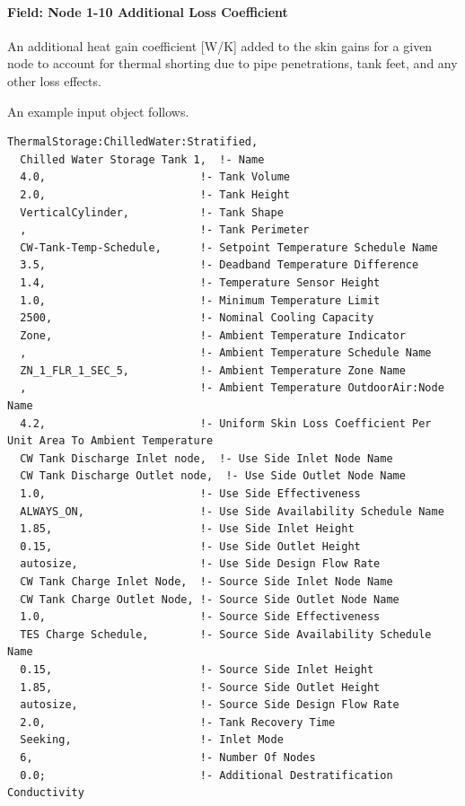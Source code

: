 \paragraph{Field: Node 1-10 Additional Loss Coefficient}\label{field-node-1-10-additional-loss-coefficient}

An additional heat gain coefficient {[}W/K{]} added to the skin gains for a given node to account for thermal shorting due to pipe penetrations, tank feet, and any other loss effects.

An example input object follows.

\begin{lstlisting}
ThermalStorage:ChilledWater:Stratified,
  Chilled Water Storage Tank 1,  !- Name
  4.0,                        !- Tank Volume
  2.0,                        !- Tank Height
  VerticalCylinder,           !- Tank Shape
  ,                           !- Tank Perimeter
  CW-Tank-Temp-Schedule,      !- Setpoint Temperature Schedule Name
  3.5,                        !- Deadband Temperature Difference
  1.4,                        !- Temperature Sensor Height
  1.0,                        !- Minimum Temperature Limit
  2500,                       !- Nominal Cooling Capacity
  Zone,                       !- Ambient Temperature Indicator
  ,                           !- Ambient Temperature Schedule Name
  ZN_1_FLR_1_SEC_5,           !- Ambient Temperature Zone Name
  ,                           !- Ambient Temperature OutdoorAir:Node Name
  4.2,                        !- Uniform Skin Loss Coefficient Per Unit Area To Ambient Temperature
  CW Tank Discharge Inlet node,  !- Use Side Inlet Node Name
  CW Tank Discharge Outlet node,  !- Use Side Outlet Node Name
  1.0,                        !- Use Side Effectiveness
  ALWAYS_ON,                  !- Use Side Availability Schedule Name
  1.85,                       !- Use Side Inlet Height
  0.15,                       !- Use Side Outlet Height
  autosize,                   !- Use Side Design Flow Rate
  CW Tank Charge Inlet Node,  !- Source Side Inlet Node Name
  CW Tank Charge Outlet Node, !- Source Side Outlet Node Name
  1.0,                        !- Source Side Effectiveness
  TES Charge Schedule,        !- Source Side Availability Schedule Name
  0.15,                       !- Source Side Inlet Height
  1.85,                       !- Source Side Outlet Height
  autosize,                   !- Source Side Design Flow Rate
  2.0,                        !- Tank Recovery Time
  Seeking,                    !- Inlet Mode
  6,                          !- Number Of Nodes
  0.0;                        !- Additional Destratification Conductivity
\end{lstlisting}

